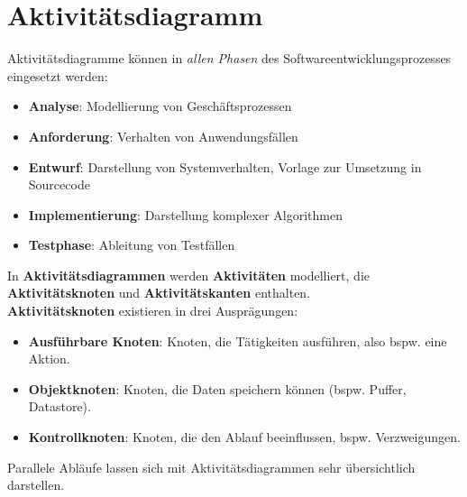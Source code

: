 \section{Aktivitätsdiagramm}

\begin{tcolorbox}[title=Einsatzbereich]
    Aktivitätsdiagramme können in \textit{allen Phasen} des Softwareentwicklungsprozesses eingesetzt werden:

    \begin{itemize}
        \item \textbf{Analyse}: Modellierung von Geschäftsprozessen
        \item \textbf{Anforderung}: Verhalten von Anwendungsfällen
        \item \textbf{Entwurf}: Darstellung von Systemverhalten, Vorlage zur Umsetzung in Sourcecode
        \item \textbf{Implementierung}: Darstellung komplexer Algorithmen
        \item \textbf{Testphase}: Ableitung von Testfällen
    \end{itemize}

    \noindentIn
    In \textbf{Aktivitätsdiagrammen} werden \textbf{Aktivitäten} modelliert, die \textbf{Aktivitätsknoten} und \textbf{Aktivitätskanten} enthalten.\\

    \noindent
    \textbf{Aktivitätsknoten} existieren in drei Ausprägungen:

    \begin{itemize}
        \item \textbf{Ausführbare Knoten}: Knoten, die Tätigkeiten ausführen, also bspw. eine Aktion.
        \item \textbf{Objektknoten}: Knoten, die Daten speichern können (bspw. Puffer, Datastore).
        \item \textbf{Kontrollknoten}: Knoten, die den Ablauf beeinflussen, bspw. Verzweigungen.
    \end{itemize}

    \noindent
    Parallele Abläufe lassen sich mit Aktivitätsdiagrammen sehr übersichtlich darstellen.
\end{tcolorbox}


